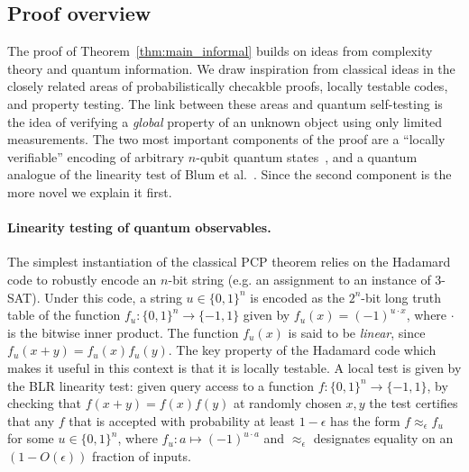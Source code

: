 \documentclass[11pt,letterpaper]{article}
\newcommand{\<}{\langle}
\renewcommand{\>}{\rangle}
\newcommand{\eps}{\epsilon}
\newcommand{\anote}[1]{\textcolor{red}{\small {\textbf{(Anand:} #1\textbf{) }}}}
\newcommand{\anote}[1]{{}}
\begin{document}


\subsection{Proof overview}


The proof of Theorem~\ref{thm:main_informal} builds on ideas from complexity
theory and quantum information. We draw inspiration from
classical ideas in the closely related areas of probabilistically checakble proofs, locally
testable codes, and property testing. The link between these
areas and quantum self-testing is the idea of verifying a \emph{global}
property of an unknown object using only limited measurements. The two most important components of
the proof are a ``locally verifiable'' encoding of arbitrary $n$-qubit
quantum states~\cite{FV14}, and a quantum analogue of the linearity
test of Blum et al.~\cite{BLR93}. Since the second component is the
more novel we explain it first.

\paragraph{Linearity testing of quantum observables.}

The simplest instantiation of the classical PCP theorem relies on the
Hadamard code to robustly encode an $n$-bit string (e.g. an assignment
to an instance of $3$-SAT). Under this code,
a string $u \in \{0,1\}^n$ is encoded as the $2^n$-bit long truth table of the
function $f_u:\{0,1\}^n \to \{-1, 1\}$ given by $f_u(x) = (-1)^{u
  \cdot x}$, where $\cdot$ is the bitwise inner product. The function
$f_u(x)$ is said to be \emph{linear}, since $f_u(x+y) = f_u(x)f_u(y)$.
The key property of the Hadamard code
which makes it useful in this context is that it is locally
testable. A local test is given by the BLR linearity test: given query
access to a function $f:\{0,1\}^n\to\{-1,1\}$, by checking that
$f(x+y)=f(x)f(y)$ at randomly chosen $x,y$ the test certifies that any
$f$ that is accepted with probability at least $1-\eps$ has the form
$f\approx_\eps f_u$ for some $u\in\{0,1\}^n$, where
$f_u:a\mapsto (-1)^{u\cdot a}$ and $\approx_\eps$ designates equality
on an $(1-O(\eps))$ fraction of inputs.
\end{document}
